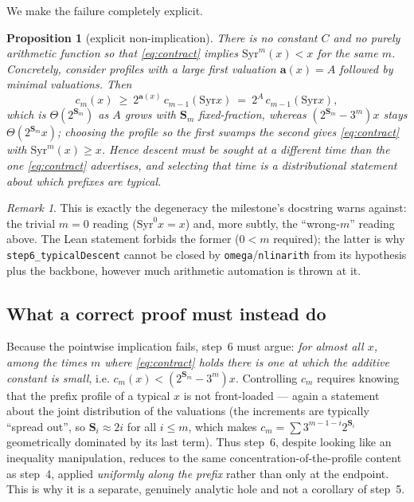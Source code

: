 \documentclass[11pt]{article}
\theoremstyle{plain}
\newtheorem{prop}[thm]{Proposition}
\theoremstyle{definition}
\theoremstyle{remark}
\newtheorem{remark}[thm]{Remark}
\newcommand{\Syr}{\mathrm{Syr}}
\newcommand{\aval}{\mathbf{a}}
\newcommand{\Ssum}{\mathbf{S}}
\newcommand{\code}[1]{\texttt{\small #1}}
\begin{document}
We make the failure completely explicit.

\begin{prop}[explicit non-implication]\label{prop:step6false}
There is no constant $C$ and no purely arithmetic function so that
\eqref{eq:contract} implies $\Syr^m(x)<x$ for the same $m$. Concretely,
consider profiles with a large first valuation $\aval(x)=A$ followed by minimal
valuations. Then
\[
  c_m(x)\ \ge\ 2^{\aval(x)}\,c_{m-1}(\Syr x)\ =\ 2^A\,c_{m-1}(\Syr x),
\]
which is $\Theta(2^{\Ssum_m})$ as $A$ grows with $\Ssum_m$ fixed-fraction,
whereas $(2^{\Ssum_m}-3^m)x$ stays $\Theta(2^{\Ssum_m}x)$; choosing the profile
so the first swamps the second gives \eqref{eq:contract} with
$\Syr^m(x)\ge x$. Hence descent must be sought at a \emph{different} time than
the one \eqref{eq:contract} advertises, and selecting that time is a
distributional statement about which prefixes are typical.
\end{prop}

\begin{remark}
This is exactly the degeneracy the milestone's docstring warns against: the
trivial $m=0$ reading ($\Syr^0 x=x$) and, more subtly, the ``wrong-$m$'' reading
above. The Lean statement forbids the former ($0<m$ required); the latter is why
\code{step6\_typicalDescent} cannot be closed by \code{omega}/\code{nlinarith}
from its hypothesis plus the backbone, however much arithmetic automation is
thrown at it.
\end{remark}

\subsection{What a correct proof must instead do}

Because the pointwise implication fails, step~6 must argue: \emph{for almost all
$x$, among the times $m$ where \eqref{eq:contract} holds there is one at which
the additive constant is small}, i.e. $c_m(x)<(2^{\Ssum_m}-3^m)x$. Controlling
$c_m$ requires knowing that the prefix profile of a typical $x$ is not
front-loaded --- again a statement about the joint distribution of the
valuations (the increments are typically ``spread out'', so
$\Ssum_i\approx 2i$ for all $i\le m$, which makes
$c_m=\sum 3^{m-1-i}2^{\Ssum_i}$ geometrically dominated by its last term). Thus
step~6, despite looking like an inequality manipulation, reduces to the same
concentration-of-the-profile content as step~4, applied \emph{uniformly along
the prefix} rather than only at the endpoint. This is why it is a separate,
genuinely analytic hole and not a corollary of step~5.
\end{document}

